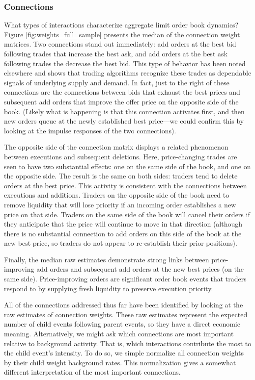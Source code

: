 \subsubsection{Connections}
What types of interactions characterize aggregate limit order book dynamics? Figure \ref{fig:weights_full_sample} presents the median of the connection weight matrices. Two connections stand out immediately: add orders at the best bid following trades that increase the best ask, and add orders at the best ask following trades the decrease the best bid. This type of behavior has been noted elsewhere and shows that trading algorithms recognize these trades as dependable signals of underlying supply and demand. In fact, just to the right of these connections are the connections between bids that exhaust the best prices and subsequent add orders that improve the offer price on the opposite side of the book. (Likely what is happening is that this connection activates first, and then new orders queue at the newly established best price—we could confirm this by looking at the impulse responses of the two connections).

The opposite side of the connection matrix displays a related phenomenon between executions and subsequent deletions. Here, price-changing trades are seen to have two substantial effects: one on the same side of the book, and one on the opposite side. The result is the same on both sides: traders tend to delete orders at the best price. This activity is consistent with the connections between executions and additions. Traders on the opposite side of the book need to remove liquidity that will lose priority if an incoming order establishes a new price on that side. Traders on the same side of the book will cancel their orders if they anticipate that the price will continue to move in that direction (although there is no substantial connection to add orders on this side of the book at the new best price, so traders do not appear to re-establish their prior positions).

Finally, the median raw estimates demonstrate strong links between price-improving add orders and subsequent add orders at the new best prices (on the same side). Price-improving orders are significant order book events that traders respond to by supplying fresh liquidity to preserve execution priority.

All of the connections addressed thus far have been identified by looking at the raw estimates of connection weights. These raw estimates represent the expected number of child events following parent events, so they have a direct economic meaning. Alternatively, we might ask which connections are most important relative to background activity. That is, which interactions contribute the most to the child event’s intensity. To do so, we simple normalize all connection weights by their child weight background rates. This normalization gives a somewhat different interpretation of the most important connections.

